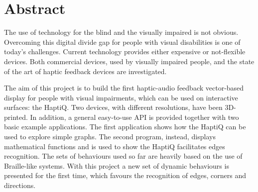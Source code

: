 \section{Abstract}

The use of technology for the blind and the visually impaired is not obvious. Overcoming this digital divide gap for people with visual disabilities is one of today's challenges. Current technology provides either expensive or not-flexible devices. Both commercial devices, used by visually impaired people, and the state of the art of haptic feedback devices are investigated.

The aim of this project is to build the first haptic-audio feedback vector-based display for people with visual impairments, which can be used on interactive surfaces: the HaptiQ. Two devices, with different resolutions, have been 3D-printed. In addition, a general easy-to-use API is provided together with two basic example applications. The first application shows how the HaptiQ can be used to explore simple graphs. The second program, instead, displays mathematical functions and is used to show the HaptiQ facilitates edges recognition.
The sets of behaviours used so far are heavily based on the use of Braille-like systems. With this project a new set of dynamic behaviours is presented for the first time, which favours the recognition of edges, corners and directions. 